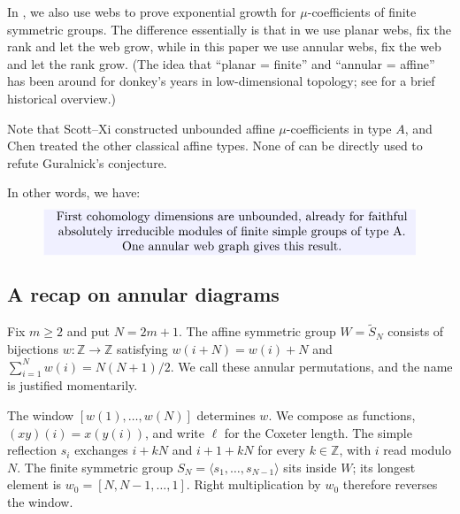 \documentclass[a4paper,11pt]{amsart}
\let\emph\relax
\numberwithin{equation}{subsection}
\theoremstyle{plain}
\theoremstyle{definition}
\theoremstyle{remark}
\begin{document}
\begin{remark}
In \cite{Finite}, we also use webs to
prove exponential growth for $\mu$-coefficients of finite
symmetric groups. The difference essentially is that in \cite{Finite} we use planar webs, fix the rank and let the web grow, while in this paper we use annular webs, fix the web and let the rank grow.
(The idea that ``planar = finite'' and ``annular = affine'' has been around for donkey's years in low-dimensional topology; see \cite[Section~1B]{HT} for a brief historical overview.)

Note that Scott--Xi \cite{SX} constructed unbounded affine $\mu$-coefficients
in type $A$, and Chen \cite{Chen} treated the other classical affine
types. None of \cite{Chen,Finite,SX} can be directly used to refute 
Guralnick's conjecture.
\end{remark}

In other words, we have:
\[
\setlength{\fboxsep}{2pt}
\colorbox{blue!6}{
\begin{minipage}{0.85\textwidth}
\centering
\emph{First cohomology dimensions are unbounded, already for
faithful absolutely irreducible modules of finite simple
groups of type A. One annular web graph gives this result.}
\end{minipage}}
\]

\subsection{A recap on annular diagrams}

Fix $m\ge2$ and put $N=2m+1$. The affine symmetric group
$W=\widetilde S_N$ consists of bijections $w:\mathbb Z\to\mathbb Z$
satisfying $w(i+N)=w(i)+N$ and
$\sum_{i=1}^Nw(i)=N(N+1)/2$. We call these annular permutations, and the name is justified momentarily.

The window $[w(1),\ldots,w(N)]$ determines $w$.
We compose as functions, $(xy)(i)=x(y(i))$, and write $\ell$
for the Coxeter length. The simple reflection $s_i$ exchanges
$i+kN$ and $i+1+kN$ for every $k\in\mathbb Z$, with $i$ read
modulo $N$. The finite symmetric group
$S_N=\langle s_1,\ldots,s_{N-1}\rangle$ sits inside $W$;
its longest element is $w_0=[N,N-1,\ldots,1]$.
Right multiplication by $w_0$ therefore reverses the window.
\end{document}
